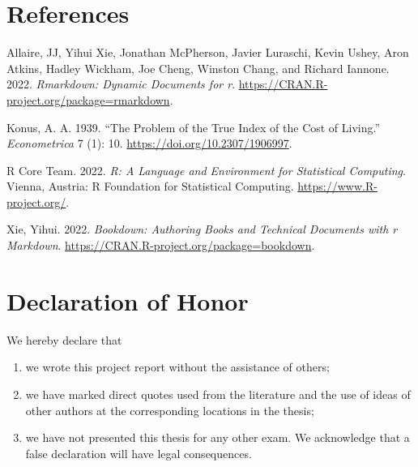 \documentclass[
  11pt,
  a4paper,
  twoside]{scrbook}
\providecommand{\tightlist}{%
  \setlength{\itemsep}{0pt}\setlength{\parskip}{0pt}}
\newlength{\cslhangindent}
\newlength{\cslentryspacingunit} %
\newenvironment{CSLReferences}[2] %
 {%
  \setlength{\parindent}{0pt}
  \ifodd #1
  \let\oldpar\par
  \def\par{\hangindent=\cslhangindent\oldpar}
  \fi
    \setlength{\parskip}{#2\cslentryspacingunit+5pt}
   }%
 {}
\begin{document}
\pagebreak

\hypertarget{references}{%
\chapter*{References}\label{references}}

\hypertarget{refs}{}
\begin{CSLReferences}{1}{0}
\leavevmode{}%
Allaire, JJ, Yihui Xie, Jonathan McPherson, Javier Luraschi, Kevin Ushey, Aron Atkins, Hadley Wickham, Joe Cheng, Winston Chang, and Richard Iannone. 2022. \emph{Rmarkdown: Dynamic Documents for r}. \url{https://CRAN.R-project.org/package=rmarkdown}.

\leavevmode{}%
Konus, A. A. 1939. {``The Problem of the True Index of the Cost of Living.''} \emph{Econometrica} 7 (1): 10. \url{https://doi.org/10.2307/1906997}.

\leavevmode{}%
R Core Team. 2022. \emph{R: A Language and Environment for Statistical Computing}. Vienna, Austria: R Foundation for Statistical Computing. \url{https://www.R-project.org/}.

\leavevmode{}%
Xie, Yihui. 2022. \emph{Bookdown: Authoring Books and Technical Documents with r Markdown}. \url{https://CRAN.R-project.org/package=bookdown}.

\end{CSLReferences}

\newpage

\hypertarget{declaration-of-honor}{%
\chapter*{Declaration of Honor}\label{declaration-of-honor}}

We hereby declare that

\begin{enumerate}
\def\labelenumi{\arabic{enumi}.}
\tightlist
\item
  we wrote this project report without the assistance of others;
\item
  we have marked direct quotes used from the literature and the use of ideas of other authors at the corresponding locations in the thesis;
\item
  we have not presented this thesis for any other exam. We acknowledge that a false declaration will have legal consequences.
\end{enumerate}
\end{document}
